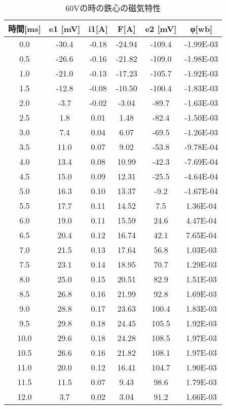 \documentclass[11pt,a4j]{jsarticle}
\begin{document}
 \begin{table}[htb]
  \begin{center}
    \caption{60Vの時の鉄心の磁気特性}
    \begin{tabular}{cccccc} \toprule
時間[ms]	&	e1 [mV]	&	i1[A]	&	F[A]	&	e2 [mV]	&	φ[wb]	\\ \midrule
0.0 	&	-30.4 	&	-0.18	&	-24.94		&	-109.4 	&	-1.99E-03	\\
0.5 	&	-26.6 	&	-0.16	&	-21.82		&	-109.0 	&	-1.98E-03	\\
1.0 	&	-21.0 	&	-0.13	&	-17.23		&	-105.7 	&	-1.92E-03	\\
1.5 	&	-12.8 	&	-0.08	&	-10.50		&	-100.4 	&	-1.83E-03	\\
2.0 	&	-3.7 	&	-0.02	&	-3.04		&	-89.7 	&	-1.63E-03	\\
2.5 	&	1.8 	&	0.01	&	1.48		&	-82.4 	&	-1.50E-03	\\
3.0 	&	7.4 	&	0.04	&	6.07		&	-69.5 	&	-1.26E-03	\\
3.5 	&	11.0 	&	0.07	&	9.02		&	-53.8 	&	-9.78E-04	\\
4.0 	&	13.4 	&	0.08	&	10.99		&	-42.3 	&	-7.69E-04	\\
4.5 	&	15.0 	&	0.09	&	12.31		&	-25.5 	&	-4.64E-04	\\
5.0 	&	16.3 	&	0.10	&	13.37		&	-9.2 	&	-1.67E-04	\\
5.5 	&	17.7 	&	0.11	&	14.52		&	7.5 	&	1.36E-04	\\
6.0 	&	19.0 	&	0.11	&	15.59		&	24.6 	&	4.47E-04	\\
6.5 	&	20.4 	&	0.12	&	16.74		&	42.1 	&	7.65E-04	\\
7.0 	&	21.5 	&	0.13	&	17.64		&	56.8 	&	1.03E-03	\\
7.5 	&	23.1 	&	0.14	&	18.95		&	70.7 	&	1.29E-03	\\
8.0 	&	25.0 	&	0.15	&	20.51		&	82.9 	&	1.51E-03	\\
8.5 	&	26.8 	&	0.16	&	21.99		&	92.8 	&	1.69E-03	\\
9.0 	&	28.8 	&	0.17	&	23.63		&	100.4 	&	1.83E-03	\\
9.5 	&	29.8 	&	0.18	&	24.45		&	105.5 	&	1.92E-03	\\
10.0 	&	29.6 	&	0.18	&	24.28		&	108.5 	&	1.97E-03	\\
10.5 	&	26.6 	&	0.16	&	21.82		&	108.1 	&	1.97E-03	\\
11.0 	&	20.0 	&	0.12	&	16.41		&	104.7 	&	1.90E-03	\\
11.5 	&	11.5 	&	0.07	&	9.43		&	98.6 	&	1.79E-03	\\
12.0 	&	3.7 	&	0.02	&	3.04		&	91.2 	&	1.66E-03	\\

\end{tabular}
\end{center}
\end{table}
\end{document}
